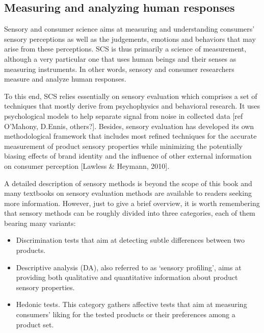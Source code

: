 \documentclass[
]{book}
\providecommand{\tightlist}{%
  \setlength{\itemsep}{0pt}\setlength{\parskip}{0pt}}
\begin{document}
\hypertarget{measuring-and-analyzing-human-responses}{%
\subsection*{Measuring and analyzing human responses}\label{measuring-and-analyzing-human-responses}}

Sensory and consumer science aims at measuring and understanding consumers' sensory perceptions as well as the judgements, emotions and behaviors that may arise from these perceptions. SCS is thus primarily a science of measurement, although a very particular one that uses human beings and their senses as measuring instruments. In other words, sensory and consumer researchers measure and analyze human responses.

To this end, SCS relies essentially on sensory evaluation which comprises a set of techniques that mostly derive from psychophysics and behavioral research. It uses psychological models to help separate signal from noise in collected data {[}ref O'Mahony, D.Ennis, others?{]}. Besides, sensory evaluation has developed its own methodological framework that includes most refined techniques for the accurate measurement of product sensory properties while minimizing the potentially biasing effects of brand identity and the influence of other external information on consumer perception {[}Lawless \& Heymann, 2010{]}.

A detailed description of sensory methods is beyond the scope of this book and many textbooks on sensory evaluation methods are available to readers seeking more information. However, just to give a brief overview, it is worth remembering that sensory methods can be roughly divided into three categories, each of them bearing many variants:

\begin{itemize}
\tightlist
\item
  Discrimination tests that aim at detecting subtle differences between two products.
\item
  Descriptive analysis (DA), also referred to as `sensory profiling', aims at providing both qualitative and quantitative information about product sensory properties.
\item
  Hedonic tests. This category gathers affective tests that aim at measuring consumers' liking for the tested products or their preferences among a product set.
\end{itemize}
\end{document}

